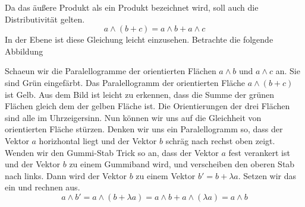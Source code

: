 \documentclass[fleqn]{scrartcl}
\numberwithin{equation}{section}
\begin{document}
Da das äußere Produkt als ein Produkt bezeichnet wird, soll auch die
Distributivität gelten.
\[a\wedge (b + c) = a\wedge b + a\wedge c\]
In der Ebene ist diese Gleichung leicht einzusehen. Betrachte die folgende
Abbildung
\begin{center}
\begin{minipage}{\linewidth}
\centering
{}
\label{fig:distributivity}
\end{minipage}
\end{center}
Schaeun wir die Paralellogramme der orientierten Flächen $a\wedge b$ und
$a\wedge c$ an. Sie sind Grün eingefärbt. Das Paralellogramm der orientierten
Fläche $a\wedge (b + c)$ ist Gelb. Aus dem Bild ist leicht zu erkennen, dass
die Summe der grünen Flächen gleich dem der gelben Fläche ist. Die
Orientierungen der drei Flächen sind alle im Uhrzeigersinn.
\newpage
Nun können wir uns auf die Gleichheit von orientierten Fläche stürzen. Denken
wir uns ein Paralellogramm so, dass der Vektor $a$ horizhontal liegt und der
Vektor $b$ schräg nach rechst oben zeigt. Wenden wir den Gummi-Stab Trick so
an, dass der Vektor $a$ fest verankert ist und der Vektor $b$ zu einem
Gummiband wird, und verscheiben den oberen Stab nach links. Dann wird der
Vektor $b$ zu einem Vektor $b'=b+\lambda a$. Setzen wir das ein und rechnen
aus.
\[a\wedge b' = a\wedge (b + \lambda a) = a \wedge b + a\wedge (\lambda a)=
a\wedge b\]
\end{document}
